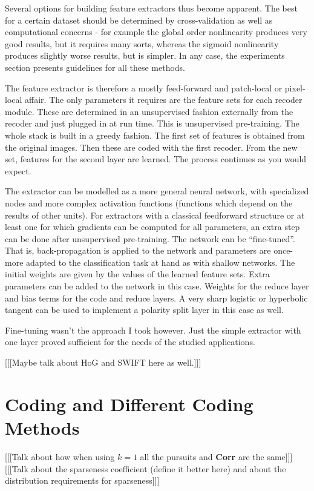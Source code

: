 \documentclass[12pt,a4paper,oneside,english]{UPBThesis}
\begin{document}
Several options for building feature extractors thus become apparent. The best for a certain dataset should be determined by cross-validation as well as computational concerns - for example the global order nonlinearity produces very good results, but it requires many sorts, whereas the sigmoid nonlinearity produces slightly worse results, but is simpler. In any case, the experiments section presents guidelines for all these methods.

The feature extractor is therefore a mostly feed-forward and patch-local or pixel-local affair. The only parameters it requires are the feature sets for each recoder module. These are determined in an unsupervised fashion externally from the recoder and just plugged in at run time. This is unsupervised pre-training. The whole stack is built in a greedy fashion. The first set of features is obtained from the original images. Then these are coded with the first recoder. From the new set, features for the second layer are learned. The process continues as you would expect. 

The extractor can be modelled as a more general neural network, with specialized nodes and more complex activation functions (functions which depend on the results of other units). For extractors with a classical feedforward structure or at least one for which gradients can be computed for all parameters, an extra step can be done after unsupervised pre-training. The network can be ``fine-tuned''. That is, back-propagation is applied to the network and parameters are once-more adapted to the classification task at hand as with shallow networks. The initial weights are given by the values of the learned feature sets. Extra parameters can be added to the network in this case. Weights for the reduce layer and bias terms for the code and reduce layers. A very sharp logistic or hyperbolic tangent can be used to implement a polarity split layer in this case as well.

Fine-tuning wasn't the approach I took however. Just the simple extractor with one layer proved sufficient for the needs of the studied applications. 

[[[Maybe talk about HoG and SWIFT here as well.]]]

\chapter{Coding and Different Coding Methods}

[[[Talk about how when using $k=1$ all the pursuits and \textbf{Corr} are the same]]]
[[[Talk about the sparseness coefficient (define it better here) and about the distribution requirements for sparseness]]]
\end{document}
